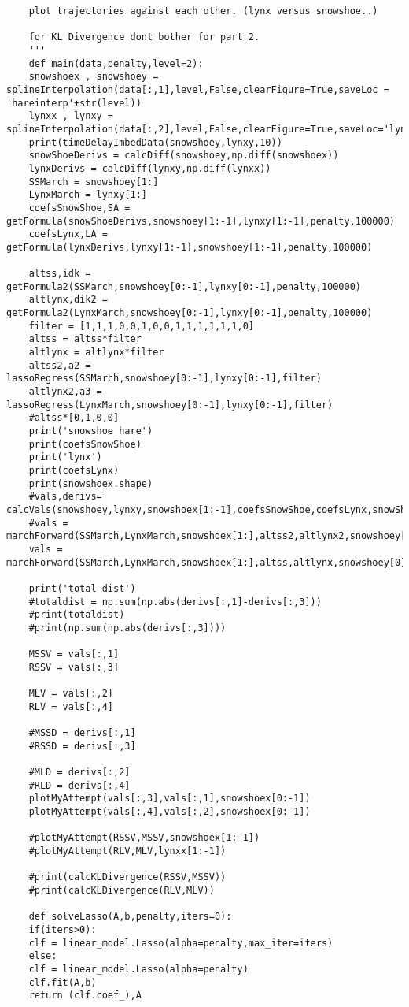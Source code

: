 \documentclass[12pt]{article}
\begin{document}
\begin{verbatim}
	plot trajectories against each other. (lynx versus snowshoe..)
	
	for KL Divergence dont bother for part 2.
	'''
	def main(data,penalty,level=2):
	snowshoex , snowshoey = splineInterpolation(data[:,1],level,False,clearFigure=True,saveLoc = 'hareinterp'+str(level))
	lynxx , lynxy = splineInterpolation(data[:,2],level,False,clearFigure=True,saveLoc='lynxinterp'+str(level))
	print(timeDelayImbedData(snowshoey,lynxy,10))
	snowShoeDerivs = calcDiff(snowshoey,np.diff(snowshoex))
	lynxDerivs = calcDiff(lynxy,np.diff(lynxx))
	SSMarch = snowshoey[1:]
	LynxMarch = lynxy[1:]
	coefsSnowShoe,SA = getFormula(snowShoeDerivs,snowshoey[1:-1],lynxy[1:-1],penalty,100000)
	coefsLynx,LA = getFormula(lynxDerivs,lynxy[1:-1],snowshoey[1:-1],penalty,100000)
	
	altss,idk = getFormula2(SSMarch,snowshoey[0:-1],lynxy[0:-1],penalty,100000)
	altlynx,dik2 = getFormula2(LynxMarch,snowshoey[0:-1],lynxy[0:-1],penalty,100000)
	filter = [1,1,1,0,0,1,0,0,1,1,1,1,1,1,0]
	altss = altss*filter
	altlynx = altlynx*filter
	altss2,a2 = lassoRegress(SSMarch,snowshoey[0:-1],lynxy[0:-1],filter)
	altlynx2,a3 = lassoRegress(LynxMarch,snowshoey[0:-1],lynxy[0:-1],filter)
	#altss*[0,1,0,0]
	print('snowshoe hare')
	print(coefsSnowShoe)
	print('lynx')
	print(coefsLynx)
	print(snowshoex.shape)
	#vals,derivs= calcVals(snowshoey,lynxy,snowshoex[1:-1],coefsSnowShoe,coefsLynx,snowShoeDerivs,lynxDerivs)
	#vals = marchForward(SSMarch,LynxMarch,snowshoex[1:],altss2,altlynx2,snowshoey[0],lynxy[0],filter)
	vals = marchForward(SSMarch,LynxMarch,snowshoex[1:],altss,altlynx,snowshoey[0],lynxy[0],filter)
	
	print('total dist')
	#totaldist = np.sum(np.abs(derivs[:,1]-derivs[:,3]))
	#print(totaldist)
	#print(np.sum(np.abs(derivs[:,3])))
	
	MSSV = vals[:,1]
	RSSV = vals[:,3]
	
	MLV = vals[:,2]
	RLV = vals[:,4]
	
	#MSSD = derivs[:,1]
	#RSSD = derivs[:,3]
	
	#MLD = derivs[:,2]
	#RLD = derivs[:,4]
	plotMyAttempt(vals[:,3],vals[:,1],snowshoex[0:-1])
	plotMyAttempt(vals[:,4],vals[:,2],snowshoex[0:-1])
	
	#plotMyAttempt(RSSV,MSSV,snowshoex[1:-1])
	#plotMyAttempt(RLV,MLV,lynxx[1:-1])
	
	#print(calcKLDivergence(RSSV,MSSV))
	#print(calcKLDivergence(RLV,MLV))
	
	def solveLasso(A,b,penalty,iters=0):
	if(iters>0):
	clf = linear_model.Lasso(alpha=penalty,max_iter=iters)
	else:
	clf = linear_model.Lasso(alpha=penalty)
	clf.fit(A,b)
	return (clf.coef_),A
	

\end{verbatim}
\end{document}
